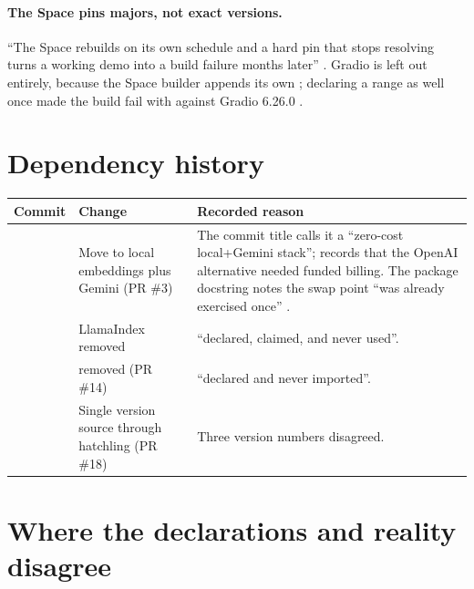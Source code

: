 \paragraph{The Space pins majors, not exact versions.} \enquote{The Space rebuilds on its own schedule and a hard pin that stops resolving turns a working demo into a build failure months later} . Gradio is left out entirely, because the Space builder appends its own ; declaring a range as well once made the build fail with  against Gradio 6.26.0 .

\section{Dependency history}

\begin{center}
\begin{tabularx}{\textwidth}{@{}>{\raggedright\arraybackslash}p{2.0cm}>{\raggedright\arraybackslash}p{4.2cm}L@{}}
\toprule
\textbf{Commit} & \textbf{Change} & \textbf{Recorded reason}\\
\midrule
{} & Move to local embeddings plus Gemini (PR \#3) & The commit title calls it a \enquote{zero-cost local+Gemini stack};  records that the OpenAI alternative needed funded billing. The package docstring notes the swap point \enquote{was already exercised once} .\\
 & LlamaIndex removed & \enquote{declared, claimed, and never used}.\\
 &  removed (PR \#14) & \enquote{declared and never imported}.\\
 & Single version source through hatchling (PR \#18) & Three version numbers disagreed.\\
\bottomrule
\end{tabularx}
\end{center}

\section{Where the declarations and reality disagree}
\label{sec:dep-findings}

